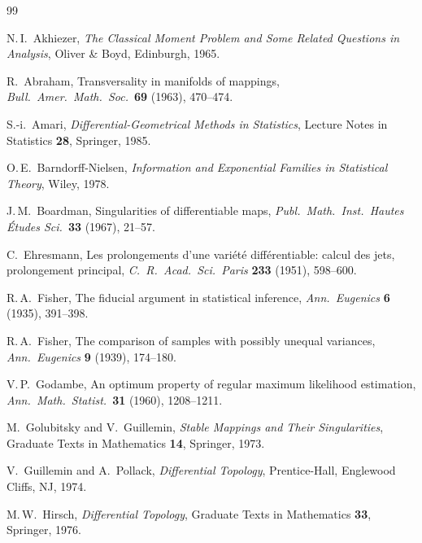 \documentclass[11pt,a4paper]{article}
\begin{document}
\begin{thebibliography}{99}

N.\,I.~Akhiezer,
\emph{The Classical Moment Problem and Some Related Questions in
  Analysis},
Oliver \& Boyd, Edinburgh, 1965.

R.~Abraham,
Transversality in manifolds of mappings,
\emph{Bull.\ Amer.\ Math.\ Soc.}\ \textbf{69} (1963), 470--474.

S.-i.~Amari,
\emph{Differential-Geometrical Methods in Statistics},
Lecture Notes in Statistics \textbf{28}, Springer, 1985.

O.\,E.~Barndorff-Nielsen,
\emph{Information and Exponential Families in Statistical Theory},
Wiley, 1978.

J.\,M.~Boardman,
Singularities of differentiable maps,
\emph{Publ.\ Math.\ Inst.\ Hautes \'Etudes Sci.}\ \textbf{33} (1967),
21--57.

C.~Ehresmann,
Les prolongements d'une vari\'et\'e diff\'erentiable: calcul des
jets, prolongement principal,
\emph{C.\ R.\ Acad.\ Sci.\ Paris} \textbf{233} (1951), 598--600.

R.\,A.~Fisher,
The fiducial argument in statistical inference,
\emph{Ann.\ Eugenics} \textbf{6} (1935), 391--398.

R.\,A.~Fisher,
The comparison of samples with possibly unequal variances,
\emph{Ann.\ Eugenics} \textbf{9} (1939), 174--180.

V.\,P.~Godambe,
An optimum property of regular maximum likelihood estimation,
\emph{Ann.\ Math.\ Statist.}\ \textbf{31} (1960), 1208--1211.

M.~Golubitsky and V.~Guillemin,
\emph{Stable Mappings and Their Singularities},
Graduate Texts in Mathematics \textbf{14}, Springer, 1973.

V.~Guillemin and A.~Pollack,
\emph{Differential Topology},
Prentice-Hall, Englewood Cliffs, NJ, 1974.

M.\,W.~Hirsch,
\emph{Differential Topology},
Graduate Texts in Mathematics \textbf{33}, Springer, 1976.


\end{thebibliography}
\end{document}
